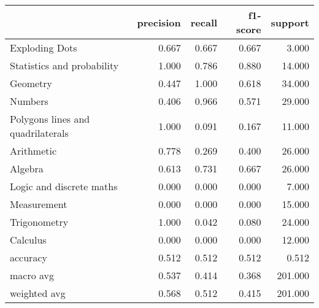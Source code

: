 \begin{tabular}{lrrrr}
\toprule
{} &  precision &  recall &  f1-score &  support \\
\midrule
Exploding Dots                    &      0.667 &   0.667 &     0.667 &    3.000 \\
Statistics and probability        &      1.000 &   0.786 &     0.880 &   14.000 \\
Geometry                          &      0.447 &   1.000 &     0.618 &   34.000 \\
Numbers                           &      0.406 &   0.966 &     0.571 &   29.000 \\
Polygons lines and quadrilaterals &      1.000 &   0.091 &     0.167 &   11.000 \\
Arithmetic                        &      0.778 &   0.269 &     0.400 &   26.000 \\
Algebra                           &      0.613 &   0.731 &     0.667 &   26.000 \\
Logic and discrete maths          &      0.000 &   0.000 &     0.000 &    7.000 \\
Measurement                       &      0.000 &   0.000 &     0.000 &   15.000 \\
Trigonometry                      &      1.000 &   0.042 &     0.080 &   24.000 \\
Calculus                          &      0.000 &   0.000 &     0.000 &   12.000 \\
accuracy                          &      0.512 &   0.512 &     0.512 &    0.512 \\
macro avg                         &      0.537 &   0.414 &     0.368 &  201.000 \\
weighted avg                      &      0.568 &   0.512 &     0.415 &  201.000 \\
\bottomrule
\end{tabular}
